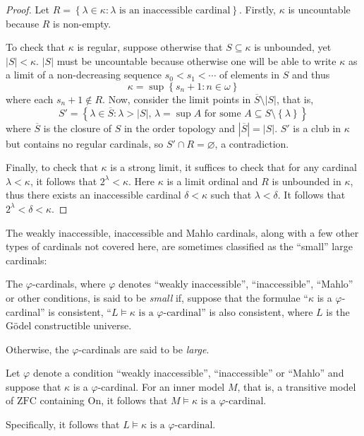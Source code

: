 \documentclass[12pt]{article}
\theoremstyle{plain}
\theoremstyle{definition}
\newcommand{\ZFC}{\mathrm{ZFC}}
\newcommand{\On}{\mathrm{On}}
\begin{document}
\begin{proof}
	Let $R = \left\{\lambda \in \kappa : \text{$\lambda$ is an inaccessible cardinal}\right\}$. Firstly, $\kappa$ is uncountable because $R$ is non-empty.

	To check that $\kappa$ is regular, suppose otherwise that $S \subseteq \kappa$ is unbounded, yet $\left|S\right| < \kappa$. $\left|S\right|$ must be uncountable because otherwise one will be able to write $\kappa$ as a limit of a non-decreasing sequence $s_0 < s_1 < \cdots$ of elements in $S$ and thus
	\[\kappa = \sup \left\{s_n + 1 : n \in \omega\right\}\]
	where each $s_n + 1 \not\in R$. Now, consider the limit points in $\overline{S} \setminus \left|S\right|$, that is,
	\[S' = \left\{\lambda \in \overline{S} : \text{$\lambda > \left|S\right|$, $\lambda = \sup A$ for some $A \subseteq S \setminus \left\{\lambda\right\}$}\right\}\]
	where $\overline{S}$ is the closure of $S$ in the order topology and $\left|\overline{S}\right| = \left|S\right|$. $S'$ is a club in $\kappa$ but contains no regular cardinals, so $S' \cap R = \varnothing$, a contradiction.

	Finally, to check that $\kappa$ is a strong limit, it suffices to check that for any cardinal $\lambda < \kappa$, it follows that $2^\lambda < \kappa$. Here $\kappa$ is a limit ordinal and $R$ is unbounded in $\kappa$, thus there exists an inaccessible cardinal $\delta < \kappa$ such that $\lambda < \delta$. It follows that $2^\lambda < \delta < \kappa$.
\end{proof}

The weakly inaccessible, inaccessible and Mahlo cardinals, along with a few other types of cardinals not covered here, are sometimes classified as the ``small'' large cardinals:

\begin{definition}
	The $\varphi$-cardinals, where $\varphi$ denotes ``weakly inaccessible'', ``inaccessible'', ``Mahlo'' or other conditions, is said to be \emph{small} if, suppose that the formulae ``$\kappa$ is a $\varphi$-cardinal'' is consistent, ``$L \vDash \text{$\kappa$ is a $\varphi$-cardinal}$'' is also consistent, where $L$ is the G\"odel constructible universe.

	Otherwise, the $\varphi$-cardinals are said to be \emph{large}.
\end{definition}

\begin{proposition}
	\label{prop:small-cardinals-absolute-for-inner-model}
	Let $\varphi$ denote a condition ``weakly inaccessible'', ``inaccessible'' or ``Mahlo'' and suppose that $\kappa$ is a $\varphi$-cardinal. For an inner model $M$, that is, a transitive model of $\ZFC$ containing $\On$, it follows that $M \vDash \text{$\kappa$ is a $\varphi$-cardinal}$.

	Specifically, it follows that $L \vDash \text{$\kappa$ is a $\varphi$-cardinal}$.
\end{proposition}
\end{document}
